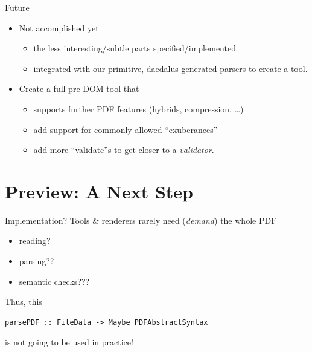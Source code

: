 \documentclass[t,10pt,xcolor={dvipsnames}]{beamer}
\begin{document}
\begin{frame}[label={sec:org23a9f3d}]{Future}
\begin{itemize}
\item Not accomplished yet
\begin{itemize}
\item the less interesting/subtle parts specified/implemented
\item integrated with our primitive, daedalus-generated parsers to create
a  tool.
\end{itemize}

\item Create a full pre-DOM tool that
\begin{itemize}
\item supports further PDF features (hybrids, compression, …)
\item add support for commonly allowed “exuberances”
\item add more “validate”s to get closer to a \emph{validator}.
\end{itemize}
\end{itemize}
\end{frame}

\section{Preview: A Next Step}
\label{sec:orgd9ab731}
\begin{frame}[label={sec:org38acb3e},fragile]{Implementation?}
 Tools \& renderers rarely need (\emph{demand}) the whole PDF
\begin{itemize}
\item reading?
\item parsing??
\item semantic checks???
\end{itemize}
\vspace{12pt}

Thus, this
\lstset{language=haskell,label= ,caption= ,captionpos=b,numbers=none}
\begin{lstlisting}
parsePDF :: FileData -> Maybe PDFAbstractSyntax
\end{lstlisting}
is not going to be used in practice!     
\end{frame}
\end{document}
